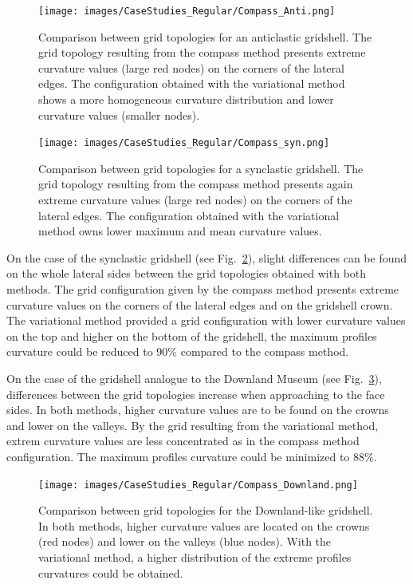 \documentclass[Thesis.tex]{subfiles}
\begin{document}
\begin{figure}
\centering
\texttt{[image: images/CaseStudies\_Regular/Compass\_Anti.png]}
\caption{Comparison between grid topologies for an anticlastic gridshell. The grid topology resulting from the compass method presents extreme curvature values (large red nodes) on the corners of the lateral edges. The configuration obtained with the variational method shows a more homogeneous curvature distribution and lower curvature values (smaller nodes).}
\label{fig:Compass_Anti}
\end{figure}

\begin{figure}
\centering
\texttt{[image: images/CaseStudies\_Regular/Compass\_syn.png]}
\caption{Comparison between grid topologies for a synclastic gridshell. The grid topology resulting from the compass method presents again extreme curvature values (large red nodes) on the corners of the lateral edges. The configuration obtained with the variational method owns lower maximum and mean curvature values.}
\label{fig:Compass_Syn}
\end{figure}

On the case of the synclastic gridshell (see Fig.~\ref{fig:Compass_Syn}), slight differences can be found on the whole lateral sides between the grid topologies obtained with both methods. The grid configuration given by the compass method presents extreme curvature values on the corners of the lateral edges and on the gridshell crown. The variational method provided a grid configuration with lower curvature values on the top and higher on the bottom of the gridshell, the  maximum profiles curvature could be reduced to 90\% compared to the compass method.

On the case of the gridshell analogue to the Downland Museum (see Fig.~\ref{fig:Compass_Downland}), differences between the grid topologies increase when approaching to the face sides. In both methods, higher curvature values are to be found on the crowns and lower on the valleys. By the grid resulting from the variational method, extrem curvature values are less concentrated as in the compass method configuration. The maximum profiles curvature could be minimized to 88\%.

\begin{figure}
\centering
\texttt{[image: images/CaseStudies\_Regular/Compass\_Downland.png]}
\caption{Comparison between grid topologies for the Downland-like gridshell. In both methods, higher curvature values are located on the crowns (red nodes) and lower on the valleys (blue nodes). With the variational method, a higher distribution of the extreme profiles curvatures could be obtained.}
\label{fig:Compass_Downland}
\end{figure}
\end{document}

